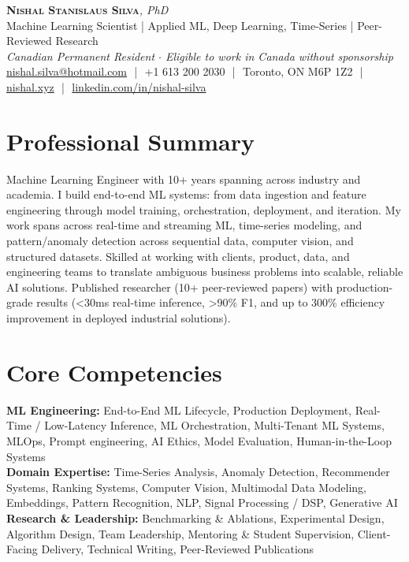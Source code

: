 \documentclass[11pt]{article}
\begin{document}
\pagestyle{empty}
\begin{center}
    {\LARGE \scshape \textbf{Nishal Stanislaus Silva}}{\large \textit{, PhD}}
    \\[1pt]
    {\small Machine Learning Scientist | Applied ML, Deep Learning, Time-Series | Peer-Reviewed Research}
    \\[1pt]
    {\footnotesize\textit{Canadian Permanent Resident $\cdot$ Eligible to work in Canada without sponsorship}}
    \\[1pt]
    {\small \href{mailto:nishal.silva@hotmail.com}{nishal.silva@hotmail.com}
    \,\,|\,\, +1 613 200 2030
    \,\,|\,\, Toronto, ON M6P 1Z2
    \,\,|\,\, \href{https://nishal.xyz}{nishal.xyz}
    \,\,|\,\, \href{https://www.linkedin.com/in/nishal-silva}{linkedin.com/in/nishal-silva}}
\end{center}

\section*{Professional Summary}
Machine Learning Engineer with 10+ years spanning across industry and academia. I build end-to-end ML systems: from data ingestion and feature engineering through model training, orchestration, deployment, and iteration. My work spans across real-time and streaming ML, time-series modeling, and pattern/anomaly detection across sequential data, computer vision, and structured datasets. Skilled at working with clients, product, data, and engineering teams to translate ambiguous business problems into scalable, reliable AI solutions. Published researcher (10+ peer-reviewed papers) with production-grade results (<30ms real-time inference, >90\% F1, and up to 300\% efficiency improvement in deployed industrial solutions).

\section*{Core Competencies}
\textbf{ML Engineering:} End-to-End ML Lifecycle, Production Deployment, Real-Time / Low-Latency Inference, ML Orchestration, Multi-Tenant ML Systems, MLOps, Prompt engineering, AI Ethics, Model Evaluation, Human-in-the-Loop Systems\\
\textbf{Domain Expertise:} Time-Series Analysis, Anomaly Detection, Recommender Systems, Ranking Systems, Computer Vision, Multimodal Data Modeling, Embeddings, Pattern Recognition, NLP, Signal Processing / DSP, Generative AI\\
\textbf{Research \& Leadership:} Benchmarking \& Ablations, Experimental Design, Algorithm Design, Team Leadership, Mentoring \& Student Supervision, Client-Facing Delivery, Technical Writing, Peer-Reviewed Publications
\end{document}
